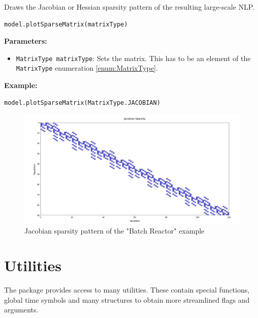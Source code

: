 \documentclass[12pt]{article}
\begin{document}
\begin{mdframed}[backgroundcolor=gray!10, roundcorner=10pt,
		linewidth=1pt]
	
	Draws the Jacobian or Hessian sparsity pattern of the resulting large-scale NLP.
 
	\begin{lstlisting}
model.plotSparseMatrix(matrixType)
		\end{lstlisting}
	\label{plotSparseMatrix}
	\textbf{Parameters:}
	\begin{itemize}
		\item \texttt{MatrixType matrixType}: Sets the matrix. This has to be an element of the \texttt{MatrixType} enumeration \eqref{enum:MatrixType}.
	\end{itemize}
	
	\textbf{Example:}
\begin{lstlisting}
model.plotSparseMatrix(MatrixType.JACOBIAN)   
\end{lstlisting}
\begin{figure}[H]
	\centering
	\includegraphics[width=1\textwidth]{images/sparse.png}
	\caption{Jacobian sparsity pattern of the "Batch Reactor" example}
	\label{fig:sparseBatch}
\end{figure}
\end{mdframed}

\section{Utilities}
The package provides access to many utilities.
These contain special functions, global time symbols and many structures to
obtain more streamlined flags and arguments.
\end{document}

